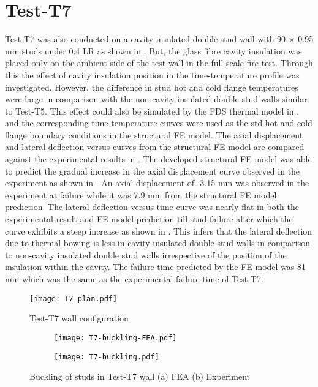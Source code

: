 \section*{Test-T7}

Test-T7 was also conducted on a cavity insulated double stud wall with 90 $\times$ 0.95 mm studs under 0.4 LR as shown in . But, the glass fibre cavity insulation was placed only on the ambient side of the test wall in the full-scale fire test. Through this the effect of cavity insulation position in the time-temperature profile was investigated. However, the difference in stud hot and cold flange temperatures were large in comparison with the non-cavity insulated double stud walls similar to Test-T5. This effect could also be simulated by the FDS thermal model in ,  and the corresponding time-temperature curves were used as the std hot and cold flange boundary conditions in the structural FE model. The axial displacement and lateral deflection versus curves from the structural FE model are compared against the experimental results in . The developed structural FE model was able to predict the gradual increase in the axial displacement curve observed in the experiment as shown in . An axial displacement of -3.15 mm was observed in the experiment at failure while it was 7.9 mm from the structural FE model prediction. The lateral deflection versus time curve was nearly flat in both the experimental result and FE model prediction till stud failure after which the curve exhibits a steep increase as shown in . This infers that the lateral deflection due to thermal bowing is less in cavity insulated double stud walls in comparison to non-cavity insulated double stud walls irrespective of the position of the insulation within the cavity. The failure time predicted by the FE model was 81 min which was the same as the experimental failure time of Test-T7.
\begin{figure}[!htbp]
	\centering
			\texttt{[image: T7-plan.pdf]}\\
		\caption{Test-T7 wall configuration}
		\label{fig:T7-plan-FEA}
\end{figure}
\begin{figure}[!htbp]
	\centering
	\begin{subfigure}[b]{0.85\textwidth}
		\centering
		\texttt{[image: T7-buckling-FEA.pdf]}
		\caption{}
		\label{subfig:T7-buckling-FEA}
	\end{subfigure}
	\begin{subfigure}[b]{0.35\textwidth}
		\centering
		\texttt{[image: T7-buckling.pdf]}
		\caption{}
		\label{subfig:T7-buckling-FEA-Exp}
	\end{subfigure}
	   \caption{Buckling of studs in Test-T7 wall (a) FEA (b) Experiment}
	   \label{fig:T7-buckling-FE-vs-Exp}
\end{figure} 
